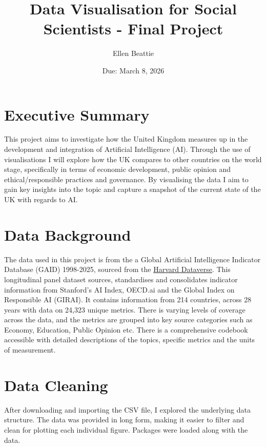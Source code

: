 \documentclass[12pt,letterpaper]{article}
\title{Data Visualisation for Social Scientists -  Final Project}
\date{Due: March 8, 2026}
\author{Ellen Beattie}
\begin{document}
	\maketitle
	
\tableofcontents
\vspace*{1cm}
	
\section{Executive Summary}
This project aims to investigate how the United Kingdom measures up in the development and integration of Artificial Intelligence (AI). Through the use of visualisations I will explore how the UK compares to other countries on the world stage, specifically in terms of economic development, public opinion and ethical/responsible practices and governance. By visualising the data I aim to gain key insights into the topic and capture a snapshot of the current state of the UK with regards to AI.


\section{Data Background}

The data used in this project is from the a Global Artificial Intelligence Indicator Database (GAID) 1998-2025, sourced from the \href{https://dataverse.harvard.edu/dataset.xhtml?persistentId=doi:10.7910/DVN/QYLYSA}{Harvard Dataverse}. This longitudinal panel dataset sources, standardises and consolidates indicator information from Stanford's AI Index, OECD.ai and the Global Index on Responsible AI (GIRAI). It contains information from 214 countries, across 28 years with data on 24,323 unique metrics. There is varying levels of coverage across the data, and the metrics are grouped into key source categories such as Economy, Education, Public Opinion etc. There is a comprehensive codebook accessible with detailed descriptions of the topics, specific metrics and the units of measurement. 


\section{Data Cleaning}

After downloading and importing the CSV file, I explored the underlying data structure. The data was provided in long form, making it easier to filter and clean for plotting each individual figure. Packages were loaded along with the data.  
	  
	 
	
\end{document}
